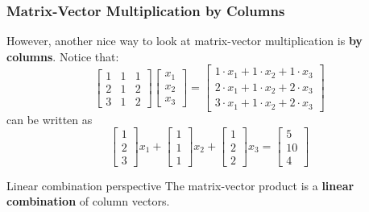 \begin{frame}
  \frametitle{Matrix-Vector Multiplication {\bf by Columns}}

  However, another nice way to look at matrix-vector multiplication is
  {\bf by columns}.  Notice that:
  \[
  \begin{bmatrix}
    1 & 1 & 1 \\
    2 & 1 & 2 \\
    3 & 1 & 2
  \end{bmatrix}
  \begin{bmatrix}
    x_1\\
    x_2\\
    x_3
  \end{bmatrix}
  =
  \begin{bmatrix}
    1\cdot x_1 + 1\cdot x_2 + 1\cdot x_3 \\
    2\cdot x_1 + 1\cdot x_2 + 2\cdot x_3 \\
    3\cdot x_1 + 1\cdot x_2 + 2\cdot x_3
  \end{bmatrix}
  \]
  \pause
  can be written as
  \[
  \begin{bmatrix}
    1\\
    2\\
    3
  \end{bmatrix}
  x_1 +
  \begin{bmatrix}
    1\\
    1\\
    1
  \end{bmatrix}
  x_2 +
  \begin{bmatrix}
    1\\
    2\\
    2
  \end{bmatrix}
  x_3
  =
  \begin{bmatrix}
    5\\
    10\\
    4
  \end{bmatrix}
  \]

  \pause
  \begin{block}{Linear combination perspective}
    The matrix-vector product is a {\bf linear combination} of column vectors.
  \end{block}
  
\end{frame} 


